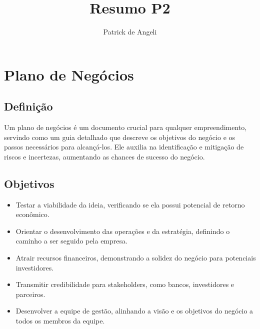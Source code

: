 \documentclass{article}
\begin{document}
\title{Resumo P2}
\author{Patrick de Angeli}
\maketitle

\tableofcontents

\newpage

\section{Plano de Negócios}

\subsection{Definição}
Um plano de negócios é um documento crucial para qualquer empreendimento, servindo como um guia detalhado que descreve os objetivos do negócio e os passos necessários para alcançá-los. Ele auxilia na identificação e mitigação de riscos e incertezas, aumentando as chances de sucesso do negócio.

\subsection{Objetivos}
\begin{itemize}
    \item Testar a viabilidade da ideia, verificando se ela possui potencial de retorno econômico.
    \item Orientar o desenvolvimento das operações e da estratégia, definindo o caminho a ser seguido pela empresa.
    \item Atrair recursos financeiros, demonstrando a solidez do negócio para potenciais investidores.
    \item Transmitir credibilidade para stakeholders, como bancos, investidores e parceiros.
    \item Desenvolver a equipe de gestão, alinhando a visão e os objetivos do negócio a todos os membros da equipe.
\end{itemize}
\end{document}
